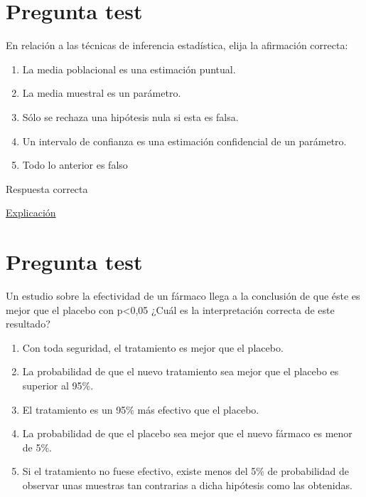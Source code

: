 \documentclass[
]{book}
\providecommand{\tightlist}{%
  \setlength{\itemsep}{0pt}\setlength{\parskip}{0pt}}
\begin{document}
\hypertarget{pregunta-test-95}{%
\section{Pregunta test}\label{pregunta-test-95}}

En relación a las técnicas de inferencia estadística, elija la afirmación correcta:

\begin{enumerate}
\def\labelenumi{\alph{enumi})}
\tightlist
\item
  La media poblacional es una estimación puntual.
\item
  La media muestral es un parámetro.
\item
  Sólo se rechaza una hipótesis nula si esta es falsa.
\item
  Un intervalo de confianza es una estimación confidencial de un parámetro.
\item
  Todo lo anterior es falso
\end{enumerate}

Respuesta correcta

\href{https://1fjmanzano.github.io/bioestadistica/estimacio\%CC\%81n-de-para\%CC\%81metros.-intervalos-de-confianza.html}{Explicación}

\hypertarget{pregunta-test-96}{%
\section{Pregunta test}\label{pregunta-test-96}}

Un estudio sobre la efectividad de un fármaco llega a la conclusión de que éste es mejor que el placebo con p\textless0,05 ¿Cuál es la interpretación correcta de este resultado?

\begin{enumerate}
\def\labelenumi{\alph{enumi})}
\tightlist
\item
  Con toda seguridad, el tratamiento es mejor que el placebo.
\item
  La probabilidad de que el nuevo tratamiento sea mejor que el placebo es superior al 95\%.
\item
  El tratamiento es un 95\% más efectivo que el placebo.
\item
  La probabilidad de que el placebo sea mejor que el nuevo fármaco es menor de 5\%.
\item
  Si el tratamiento no fuese efectivo, existe menos del 5\% de probabilidad de observar unas muestras tan contrarias a dicha hipótesis como las obtenidas.
\end{enumerate}
\end{document}
